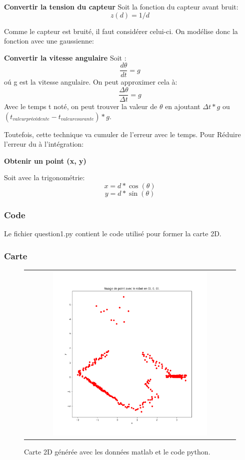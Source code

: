 \documentclass[12pt]{article}
\begin{document}
\textbf{Convertir la tension du capteur}
Soit la fonction du capteur avant bruit:
\[ z(d) = 1/d \]

Comme le capteur est bruité, il faut consid\'erer celui-ci. On mod\'elise donc la fonction avec une gaussienne:

\textbf{Convertir la vitesse angulaire}
Soit :
\[ \frac{d\theta}{dt} = g \] o\'u g est la vitesse angulaire.
On peut approximer cela \`a:
\[ \frac{\Delta \theta}{\Delta t}  = g\]
Avec le temps t noté, on peut trouver la valeur de $\theta$ en ajoutant $\Delta t * g $ ou $ (t_{valeur précédente} - t_{valeur courante}) * g$.

Toutefois, cette technique va cumuler de l'erreur avec le temps.
Pour Réduire l'erreur du à l'intégration:

\textbf{Obtenir un point (x, y)}

Soit avec la trigonométrie:
\[ x = d*\cos(\theta) \] \[ y = d*\sin(\theta) \]

\subsubsection{Code}
Le fichier question1.py contient le code utilisé pour former la carte 2D.
\subsubsection{Carte}

\begin{figure}[ht]
 \begin{center}
  \begin{tabular}{c}
    \includegraphics[width=0.75\textwidth]{q1-carte-local.png}
  \end{tabular}
 \end{center}
\vspace{-0.25in}
 \caption{Carte 2D générée avec les données matlab et le code python.}
    \label{carte-2d-locale}
\end{figure}
\end{document}
